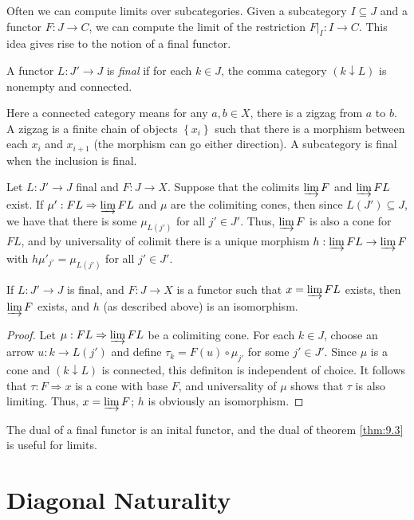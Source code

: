 Often we can compute limits over subcategories. Given a subcategory $I\subseteq J$ and a functor $F : J \to C$, we can compute the limit of the restriction $F|_I : I \to C$. This idea gives rise to the notion of a final functor.

\begin{definition}\label{dfn:9.2}
	A functor $L : J' \to J$ is \emph{final} if for each $k\in J$, the comma category $(k\downarrow L)$ is nonempty and connected.
\end{definition}
Here a connected category means for any $a,b\in X$, there is a zigzag from $a$ to $b$. A zigzag is a finite chain of objects $\left\{ x_i \right\} $ such that there is a morphism between each $x_i$ and $x_{i+1} $ (the morphism can go either direction). A subcategory is final when the inclusion is final.

Let $L : J' \to J$ final and $F : J \to X$. Suppose that the colimits $\varinjlim F$ and $\varinjlim FL$ exist. If $\mu' : FL \Rightarrow \varinjlim FL$ and $\mu$ are the colimiting cones, then since $L(J')\subseteq J$, we have that there is some $\mu_{L(j')} $ for all $j'\in J'$. Thus, $\varinjlim F$ is also a cone for $FL$, and by universality of colimit there is a unique morphism $h : \varinjlim FL \to \varinjlim F$ with $h\mu'_{j'}=\mu_{L(j')} $ for all $j'\in J'$.

\begin{theorem}\label{thm:9.3}
	If $L : J' \to J$ is final, and $F : J \to X$ is a functor such that $x=\varinjlim FL$ exists, then $\varinjlim F$ exists, and $h$ (as described above) is an isomorphism.
\end{theorem}
\begin{proof}
Let $\mu : FL \Rightarrow \varinjlim FL$ be a colimiting cone. For each $k\in J$, choose an arrow $u : k \to L(j')$ and define $\tau_k = F(u)\circ \mu_{j'} $ for some $j'\in J'$. Since $\mu$ is a cone and $(k\downarrow L)$ is connected, this definiton is independent of choice. It follows that $\tau : F \Rightarrow x$ is a cone with base $F$, and universality of $\mu$ shows that $\tau$ is also limiting. Thus, $x=\varinjlim F$; $h$ is obviously an isomorphism.
\end{proof}

The dual of a final functor is an inital functor, and the dual of theorem \ref{thm:9.3} is useful for limits.
\section{Diagonal Naturality}

